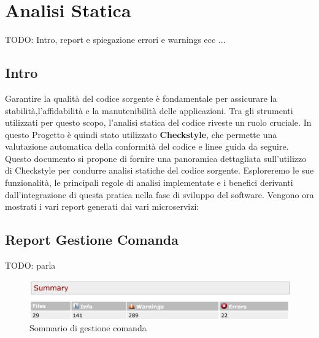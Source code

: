 \section{Analisi Statica}

TODO: Intro, report e spiegazione errori e warnings ecc ...

\subsection{Intro}

Garantire la qualità del codice sorgente è fondamentale per assicurare la stabilità,l'affidabilità e la manutenibilità delle applicazioni. Tra gli strumenti utilizzati per questo scopo, l'analisi statica del codice riveste un ruolo cruciale. In questo Progetto è quindi stato utilizzato \textbf{\textbf{Checkstyle}}, che permette una valutazione automatica della conformità del codice e linee guida da seguire.
\\
Questo documento si propone di fornire una panoramica dettagliata sull'utilizzo di Checkstyle per condurre analisi statiche del codice sorgente. Esploreremo le sue funzionalità, le principali regole di analisi implementate e i benefici derivanti dall'integrazione di questa pratica nella fase di sviluppo del software. Vengono ora mostrati i vari report generati dai vari microservizi:

\newpage

\subsection{Report Gestione Comanda}

TODO: parla
\begin{figure}[htbp]
	\centering
	\includegraphics[scale=0.6]{iterazione1/images/Cs_Summary_Gestione_Comanda.jpg}
	\caption{Sommario di gestione comanda\label{fig:Cs_Summary_Gestione_Comanda}}
\end{figure}

